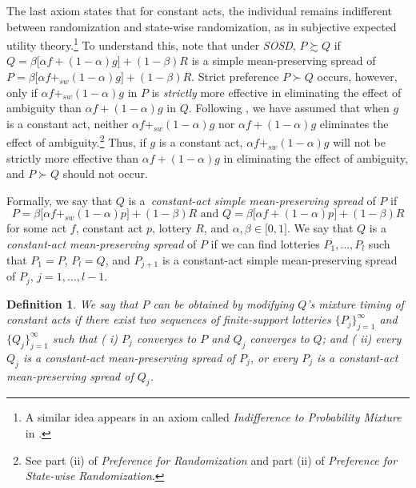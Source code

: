 \documentclass[12pt, notitlepage]{article}
\newtheorem{definition}{Definition}
\begin{document}
The last axiom states that for constant acts, the individual remains
indifferent between randomization and state-wise randomization, as in
subjective expected utility theory.\footnote{%
A similar idea appears in an axiom called \textit{Indifference to
Probability Mixture} in \cite{Saito13}.} To understand this, note that under 
\textit{SOSD}, $P\succsim Q$ if $Q=\beta \lbrack \alpha f+(1-\alpha
)g]+(1-\beta )R$ is a simple mean-preserving spread of $P=\beta \lbrack
\alpha f+_{sw}(1-\alpha )g]+(1-\beta )R$. Strict preference $P\succ Q$
occurs, however, only if $\alpha f+_{sw}(1-\alpha )g$ in $P$ is \textit{%
strictly} more effective in eliminating the effect of ambiguity than $\alpha
f+(1-\alpha )g$ in $Q$. Following \cite{GilboaSchmeidler89}, we have assumed
that when $g$ is a constant act, neither $\alpha f+_{sw}(1-\alpha )g$ nor $%
\alpha f+(1-\alpha )g$ eliminates the effect of ambiguity.\footnote{%
See part (\textrm{ii}) of \textit{Preference for Randomization} and part
(ii) of \textit{Preference for State-wise Randomization}.} Thus, if $g$ is a
constant act, $\alpha f+_{sw}(1-\alpha )g$ will not be strictly more
effective than $\alpha f+(1-\alpha )g$ in eliminating the effect of
ambiguity, and $P\succ Q$ should not occur.

Formally, we say that $Q$ is a\textit{\ constant-act simple mean-preserving
spread} of $P$ if%
\begin{equation*}
P=\beta \lbrack \alpha f+_{sw}(1-\alpha )p]+(1-\beta )R\text{ and }Q=\beta
\lbrack \alpha f+(1-\alpha )p]+(1-\beta )R
\end{equation*}%
for some act $f$, constant act $p$, lottery $R$, and $\alpha ,\beta \in
\lbrack 0,1]$. We say that $Q$ is a \textit{constant-act mean-preserving
spread} of $P$ if we can find lotteries $P_{1},\dots ,P_{l}$ such that $%
P_{1}=P$, $P_{l}=Q$, and $P_{j+1}$ is a constant-act simple mean-preserving
spread of $P_{j}$, $j=1,\dots ,l-1$.

\begin{definition}
We say that $P$ can be obtained by modifying $Q$'s mixture timing of
constant acts if there exist two sequences of finite-support lotteries $%
\{P_{j}\}_{j=1}^{\infty }$ and $\{Q_{j}\}_{j=1}^{\infty }$ such that (%
\textrm{i}) $P_{j}$ converges to $P$ and $Q_{j}$ converges to $Q$; and (%
\textrm{ii}) every $Q_{j}$ is a \textit{constant-act mean-preserving spread}
of $P_{j}$, or every $P_{j}$ is a constant-act \textit{mean-preserving spread%
} of $Q_{j}$.
\end{definition}
\end{document}

